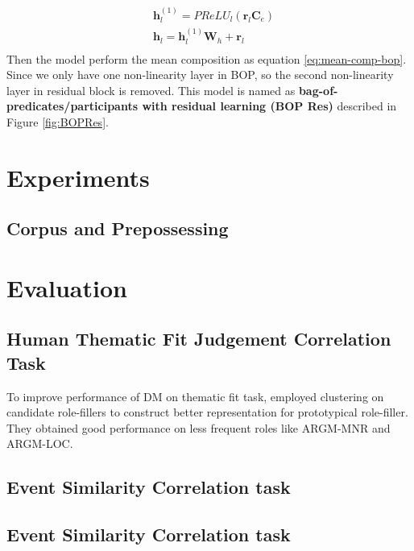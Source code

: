 \documentclass[a4paper]{article}
\begin{document}
\begin{equation} \label{eq:hidden-bopres}
\begin{aligned}
    & \mathbf{h}_l^{(1)}
        = PReLU_l(\mathbf{r}_l \mathbf{C}_e) \\
    & \mathbf{h}_{l}
        = \mathbf{h}_{l}^{(1)}\mathbf{W}_h + \mathbf{r}_l \\
\end{aligned}
\end{equation}
Then the model perform the mean composition as  equation \eqref{eq:mean-comp-bop}. Since we only have one non-linearity layer in BOP, so the second non-linearity layer in residual block is removed. This model is named as \textbf{bag-of-predicates/participants with residual learning (BOP Res)} described in Figure \ref{fig:BOPRes}. 



\newpage
\section{Experiments}  \label{sec:exp}
\subsection{Corpus and Prepossessing} \label{sec:corpus}







\section{Evaluation}  \label{sec:evaluation}
\subsection{Human Thematic Fit Judgement Correlation Task}  \label{sec:thematicfit}
To improve performance of DM on thematic fit task, \citet{greenberg2015improving} employed clustering on candidate role-fillers to construct better representation for prototypical role-filler. They obtained good performance on less frequent roles like ARGM-MNR and ARGM-LOC. 

\subsection{Event Similarity Correlation task}  \label{sec:wordsim}


\subsection{Event Similarity Correlation task}  \label{sec:eventsim}
\end{document}
